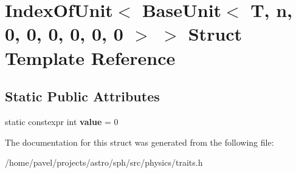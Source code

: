 \hypertarget{structIndexOfUnit_3_01BaseUnit_3_01T_00_01n_00_010_00_010_00_010_00_010_00_010_00_010_01_4_01_4}{}\section{Index\+Of\+Unit$<$ Base\+Unit$<$ T, n, 0, 0, 0, 0, 0, 0 $>$ $>$ Struct Template Reference}
\label{structIndexOfUnit_3_01BaseUnit_3_01T_00_01n_00_010_00_010_00_010_00_010_00_010_00_010_01_4_01_4}
\subsection*{Static Public Attributes}
\begin{DoxyCompactItemize}
\item 
\hypertarget{structIndexOfUnit_3_01BaseUnit_3_01T_00_01n_00_010_00_010_00_010_00_010_00_010_00_010_01_4_01_4_ad4da32ea2cefaff4b662d89b02cce497}{}\label{structIndexOfUnit_3_01BaseUnit_3_01T_00_01n_00_010_00_010_00_010_00_010_00_010_00_010_01_4_01_4_ad4da32ea2cefaff4b662d89b02cce497} 
static constexpr int {\bfseries value} = 0
\end{DoxyCompactItemize}


The documentation for this struct was generated from the following file\+:\begin{DoxyCompactItemize}
\item 
/home/pavel/projects/astro/sph/src/physics/traits.\+h\end{DoxyCompactItemize}
